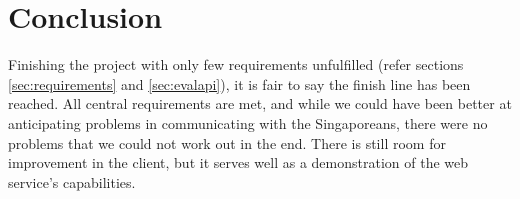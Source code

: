 \section{Conclusion}
Finishing the project with only few requirements unfulfilled (refer sections
\ref{sec:requirements} and \ref{sec:evalapi}), it is fair to say the finish
line has been reached. All central requirements are met, and while we could
have been better at anticipating problems in communicating with the
Singaporeans, there were no problems that we could not work out in the end.
There is still room for improvement in the client, but it serves well as a
demonstration of the web service's capabilities.
